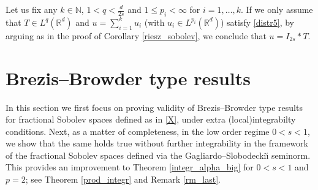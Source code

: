 \documentclass[letterpaper, 11pt,  reqno]{amsart}
\theoremstyle{definition}
\theoremstyle{remark}
\numberwithin{equation}{section}
\newcommand{\N}{{\mathbb N}}
\newcommand{\R}{{\mathbb R}}
\begin{document}
\vspace{-1.5mm}
\remark \label{RZ_ext} Let us fix any $k\in \N$, $1<q<\frac{d}{2s}$ and $1\le p_i<\infty$ for $i=1,\dots, k$.  If we only assume  that $T\in  L^{q}(\R^d)$ and  $u=\sum_{i=1}^{k}u_i$ (with $u_i\in L^{p_i}(\R^d)$) satisfy \eqref{distr5},  by arguing as in the proof of Corollary \ref{riesz_sobolev}, we conclude that $u=I_{2s}*T$.
	
	\section{Br{e}zis--Browder type results}\label{sec4}
In this section we first focus on proving validity of Brezis--Browder type results for fractional Sobolev spaces defined as in \eqref{X}, under extra (local)integrabilty conditions. Next, as a matter of completeness, in the low order regime $0<s<1$, we show that the same holds true without further integrability in the framework of the fractional Sobolev spaces defined via the Gagliardo--Slobodecki\u{\i} seminorm. This provides an improvement to Theorem \ref{integr_alpha_big} for $0<s<1$ and $p=2$; see Theorem \ref{prod_integr} and Remark \ref{rm_last}. 
\end{document}
